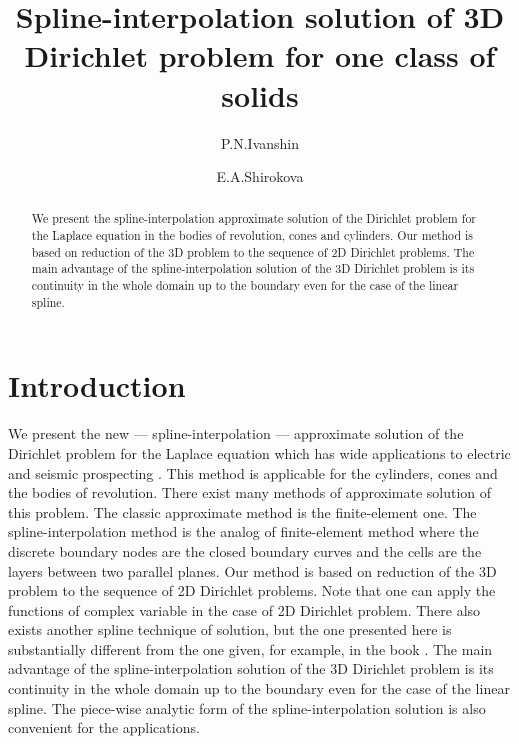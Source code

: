 \documentclass{amsart}
\begin{document}
\title{Spline-interpolation solution of 3D Dirichlet problem for one class of solids}

\author{P.N.Ivanshin}
\address{Physics Institute, Kazan Federal
University, Kazan, 420008, Russia}
\author{E.A.Shirokova}
\address{Mathematics \& Mechanics Institute, Kazan Federal
University, Kazan, 420008, Russia}







\maketitle

\begin{abstract}
We present the spline-interpolation approximate solution of the
Dirichlet problem for the Laplace equation in the bodies of
revolution, cones and cylinders. Our method is based on reduction of
the 3D problem to the sequence of 2D Dirichlet problems. The main
advantage of the spline-interpolation solution of the 3D Dirichlet
problem is its continuity in the whole domain up to the boundary
even for the case of the linear spline.
\end{abstract}






\section{Introduction}

We present the new --- spline-interpolation --- approximate solution
of the Dirichlet problem for the Laplace equation  which has wide
applications to electric and seismic prospecting \cite{Back, CMM,
DL, Keller, Nei, Wen}. This method is applicable for the cylinders,
cones and the bodies of revolution. There exist many methods of
approximate solution of this problem. The classic approximate method
is the finite-element one. The spline-interpolation method is the
analog of finite-element method where the discrete boundary nodes
are the closed boundary curves and the cells are the layers between
two parallel planes. Our method is based on reduction of the 3D
problem to the sequence of 2D Dirichlet problems. Note that one can
apply the functions of complex variable in the case of 2D Dirichlet
problem. There also exists another spline technique of solution, but
the one presented here is substantially different from the one
given, for example, in the book \cite{Iso}. The main advantage of
the spline-interpolation solution of the 3D Dirichlet problem is its
continuity in the whole domain up to the boundary even for the case
of the linear spline. The piece-wise analytic form of the
spline-interpolation solution is also convenient for the
applications.
\end{document}
